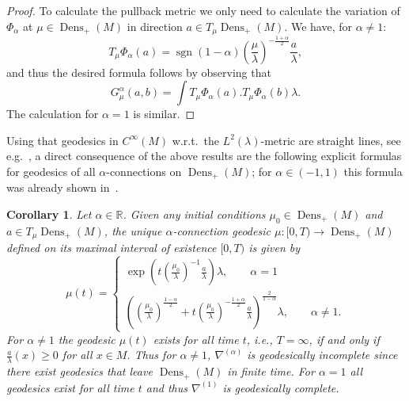 \documentclass[11pt,reqno]{amsart}
\newtheorem{corollary}[theorem]{Corollary}
\theoremstyle{definition}
\newcommand{\dx}{\lambda}
\newcommand{\Dens}{\operatorname{Dens}_+(M)}
\begin{document}
\begin{proof}
To calculate the pullback metric we only need to calculate the variation of $\Phi_{\alpha}$ at $\mu\in\Dens$ in direction $a\in T_{\mu}\Dens$. We have, for $\alpha\ne 1$:
\begin{equation*}
T_\mu\Phi_{\alpha}(a)=\operatorname{sgn}(1-\alpha)\left(\frac{\mu}{\dx}\right)^{-\tfrac{1+\alpha}2}\frac{a}{\dx},
\end{equation*}
and thus the desired formula follows by observing that 
\begin{equation*}
G^{\alpha}_\mu(a,b)=\int T_\mu\Phi_{\alpha}(a).T_\mu\Phi_{\alpha}(b) \dx.
\end{equation*}
The calculation for $\alpha=1$ is similar.
\end{proof}
Using that geodesics in $C^{\infty}(M)$ w.r.t.\ the $L^2(\dx)$-metric are straight lines, see e.g.~\cite{bruveris20182}, a direct consequence of  the above results are the following explicit formulas for geodesics of all $\alpha$-connections on $\Dens$; for $\alpha\in(-1,1)$ this formula was already shown in~\cite{bauer2024p}.
\begin{corollary}
Let $\alpha \in \mathbb R$. Given any initial conditions $\mu_0\in \Dens$ and $a\in T_\mu \Dens$, the unique $\alpha$-connection geodesic $\mu:[0,T)\to \Dens$
    defined on its maximal interval of existence $[0,T)$ is given by
    \begin{equation*}
    \mu(t)=\begin{cases}
    \operatorname{exp}\left(
    t\left(\frac{\mu_0}{\dx}\right)^{-1}
    \frac{a}{\dx}\right) \dx,\qquad \alpha=1\\
      \left(\left(\frac{\mu_0}{\dx}\right)^{\frac{1-\alpha}{2}}+
    t\left(\frac{\mu_0}{\dx}\right)^{-\frac{1+\alpha}{2}}\frac{a}{\dx}\right)^{\frac{2}{1-\alpha}} \dx, \qquad \alpha\neq 1.   
    \end{cases}
    \end{equation*}
    For $\alpha\neq 1$ the geodesic $\mu(t)$ exists for all time $t$, i.e., $T=\infty$, if and only if $\frac{a}{\dx}(x)\geq0$ for all $x\in M$. 
    Thus for $\alpha\neq 1$, $\nabla^{(\alpha)}$ is  geodesically incomplete since there exist geodesics that leave $\Dens$ in finite time.  For $\alpha=1$ all geodesics exist for all time $t$ and thus $\nabla^{(1)}$  is geodesically complete.    
\end{corollary}
\end{document}

